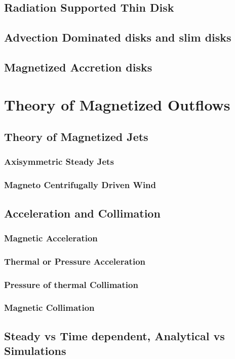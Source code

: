 \documentclass[10pt,a4paper]{article}
\begin{document}
\subsection{Radiation Supported Thin Disk}
\subsection{Advection Dominated disks and slim disks}
\subsection{Magnetized Accretion disks}

\section{Theory of Magnetized Outflows}
\subsection{Theory of Magnetized Jets}
\subsubsection{Axisymmetric Steady Jets}
\subsubsection{Magneto Centrifugally Driven Wind}
\subsection{Acceleration and Collimation}
\subsubsection{Magnetic Acceleration}
\subsubsection{Thermal or Pressure Acceleration}
\subsubsection{Pressure of thermal Collimation}
\subsubsection{Magnetic Collimation}
\subsection{Steady vs Time dependent, Analytical vs Simulations}
\end{document}
